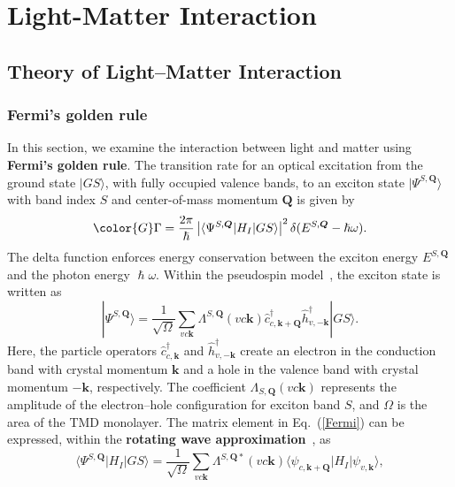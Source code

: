 \chapter{Light-Matter Interaction}
\label{ch:method}

\section{Theory of Light--Matter Interaction}
\subsection{Fermi's golden rule}

In this section, we examine the interaction between light and matter using \textbf{Fermi's golden rule}. The transition rate for an optical excitation from the ground state $|GS\rangle$, with fully occupied valence bands, to an exciton state $|\Psi^{S, \boldsymbol{Q}}\rangle$ with band index $S$ and center-of-mass momentum $\boldsymbol{Q}$ is given by
\begin{equation}
\color{G}
\Gamma=\frac{2\pi}{\hslash}
\left|
\langle\Psi^{S, \boldsymbol{Q}}|H_I|GS\rangle
\right|^2
\delta(E^{S, \boldsymbol{Q}}-\hslash\omega).
\label{Fermi}
\end{equation}
The delta function enforces energy conservation between the exciton energy $E^{S, \boldsymbol{Q}}$ and the photon energy $\hslash\omega$. Within the pseudospin model~\cite{simbulan2021selective, peng2022tailoring, sanchez2024enhanced}, the exciton state is written as
\begin{equation}
|\Psi^{S, \boldsymbol{Q}}\rangle
=
\frac{1}{\sqrt{\Omega}} 
\sum_{vc\boldsymbol{k}} 
\Lambda^{S,\boldsymbol{Q}}(vc\boldsymbol{k})
\hat{c}^\dagger_{c,\boldsymbol{k}+\boldsymbol{Q}} 
\hat{h}^\dagger_{v,-\boldsymbol{k}} 
|GS\rangle.
\label{EXstate}
\end{equation}
Here, the particle operators $\hat{c}_{c,\boldsymbol{k}}^\dagger$ and $\hat{h}_{v,-\boldsymbol{k}}^\dagger$ create an electron in the conduction band with crystal momentum $\boldsymbol{k}$ and a hole in the valence band with crystal momentum $-\boldsymbol{k}$, respectively. The coefficient $\Lambda_{S,\boldsymbol{Q}}(vc\boldsymbol{k})$ represents the amplitude of the electron--hole configuration for exciton band $S$, and $\Omega$ is the area of the TMD monolayer.
The matrix element in Eq.~(\ref{Fermi}) can be expressed, within the \textbf{rotating wave approximation}~\cite{griffiths2018introduction}, as
\begin{equation}
\langle\Psi^{S, \boldsymbol{Q}}|H_I|GS\rangle 
=
\frac{1}{\sqrt{\Omega}} 
\sum_{vc\boldsymbol{k}} 
\Lambda^{S,\boldsymbol{Q} *}(vc\boldsymbol{k}) 
\langle\psi_{c, \boldsymbol{k}+\boldsymbol{Q}}|H_I|\psi_{v, \boldsymbol{k}}\rangle,
\label{eq:matrix_element}
\end{equation}
